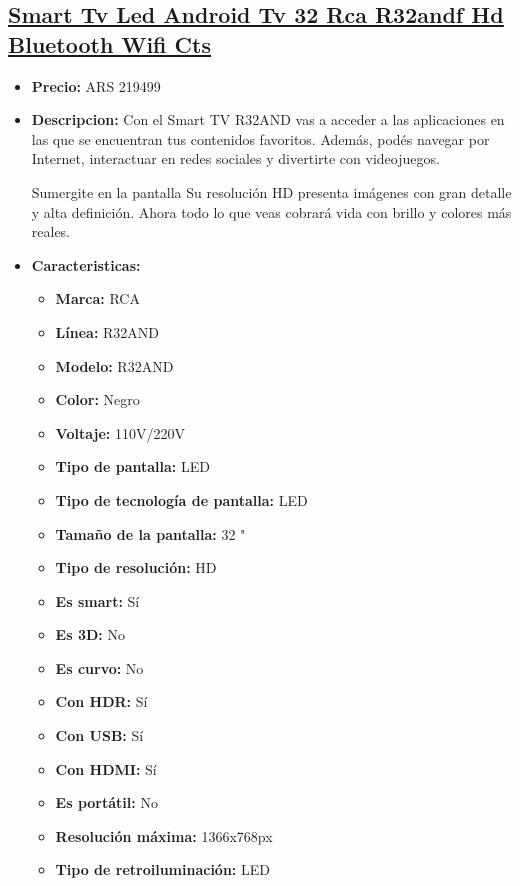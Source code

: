 \documentclass{article}
\begin{document}
    
    \begin{adjustwidth}{2em}{}

    \subsection{\underline{\href{https://www.mercadolibre.com.ar/smart-tv-led-android-tv-32-rca-r32andf-hd-bluetooth-wifi-cts/p/MLA27977446}{Smart Tv Led Android Tv 32 Rca R32andf Hd Bluetooth Wifi Cts}}}
    \begin{itemize}
        \item \textbf{Precio:} ARS 219499
        \item \textbf{Descripcion:} 
Con el Smart TV R32AND vas a acceder a las aplicaciones en las que se encuentran tus contenidos favoritos. Además, podés navegar por Internet, interactuar en redes sociales y divertirte con videojuegos.

Sumergite en la pantalla
Su resolución HD presenta imágenes con gran detalle y alta definición. Ahora todo lo que veas cobrará vida con brillo y colores más reales.
        \item \textbf{Caracteristicas:} 
        \begin{itemize}
            \item \textbf {Marca:} RCA
    \item \textbf {Línea:} R32AND
    \item \textbf {Modelo:} R32AND
    \item \textbf {Color:} Negro
    \item \textbf {Voltaje:} 110V/220V
    \item \textbf {Tipo de pantalla:} LED
    \item \textbf {Tipo de tecnología de pantalla:} LED
    \item \textbf {Tamaño de la pantalla:} 32 "
    \item \textbf {Tipo de resolución:} HD
    \item \textbf {Es smart:} Sí
    \item \textbf {Es 3D:} No
    \item \textbf {Es curvo:} No
    \item \textbf {Con HDR:} Sí
    \item \textbf {Con USB:} Sí
    \item \textbf {Con HDMI:} Sí
    \item \textbf {Es portátil:} No
    \item \textbf {Resolución máxima:} 1366x768px
    \item \textbf {Tipo de retroiluminación:} LED
        \end{itemize}
    \end{itemize}

    \vspace{1\baselineskip} %
    \end{adjustwidth}

    
    
\end{document}
